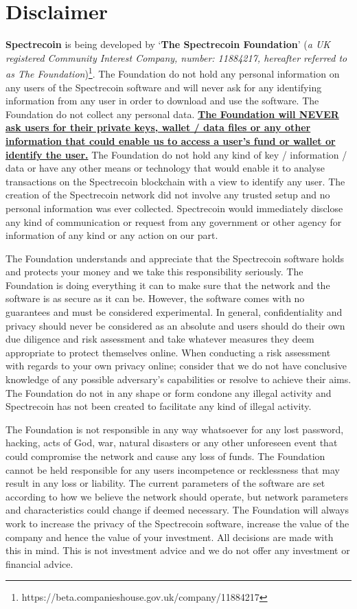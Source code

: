 \chapter{Disclaimer}
\textbf{Spectrecoin} is being developed by ‘\textbf{The Spectrecoin Foundation}’ (\textit{a UK registered Community Interest Company, number: 11884217, hereafter referred to as The Foundation})\footnote{https://beta.companieshouse.gov.uk/company/11884217}. The Foundation do not hold any personal information on any users of the Spectrecoin software and will never ask for any identifying information from any user in order to download and use the software. The Foundation do not collect any personal data. \textbf{\underline{The Foundation will NEVER ask users for their private keys, wallet / data files or any other information that could enable us to access a user’s fund or wallet or identify the user.}} The Foundation do not hold any kind of key / information / data or have any other means or technology that would enable it to analyse transactions on the Spectrecoin blockchain with a view to identify any user. The creation of the Spectrecoin network did not involve any trusted setup and no personal information was ever collected. Spectrecoin would immediately disclose any kind of communication or request from any government or other agency for information of any kind or any action on our part. 

 

The Foundation understands and appreciate that the Spectrecoin software holds and protects your money and we take this responsibility seriously. The Foundation is doing everything it can to make sure that the network and the software is as secure as it can be. However, the software comes with no guarantees and must be considered experimental. In general, confidentiality and privacy should never be considered as an absolute and users should do their own due diligence and risk assessment and take whatever measures they deem appropriate to protect themselves online. When conducting a risk assessment with regards to your own privacy online; consider that we do not have conclusive knowledge of any possible adversary’s capabilities or resolve to achieve their aims. The Foundation do not in any shape or form condone any illegal activity and Spectrecoin has not been created to facilitate any kind of illegal activity. 

 

The Foundation is not responsible in any way whatsoever for any lost password, hacking, acts of God, war, natural disasters or any other unforeseen event that could compromise the network and cause any loss of funds. The Foundation cannot be held responsible for any users incompetence or recklessness that may result in any loss or liability. The current parameters of the software are set according to how we believe the network should operate, but network parameters and characteristics could change if deemed necessary. The Foundation will always work to increase the privacy of the Spectrecoin software, increase the value of the company and hence the value of your investment. All decisions are made with this in mind. This is not investment advice and we do not offer any investment or financial advice. 

